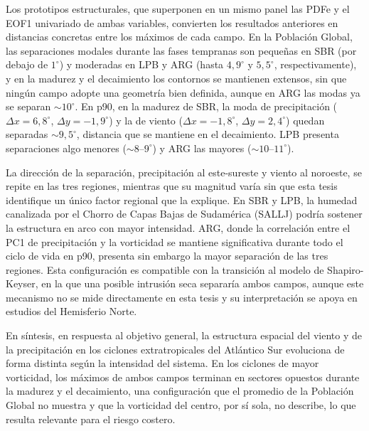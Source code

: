 Los prototipos estructurales, que superponen en un mismo panel las PDFe y el EOF1 univariado de ambas variables, convierten los resultados anteriores en distancias concretas entre los máximos de cada campo. En la Población Global, las separaciones modales durante las fases tempranas son pequeñas en SBR (por debajo de $1^{\circ}$) y moderadas en LPB y ARG (hasta $4{,}9^{\circ}$ y $5{,}5^{\circ}$, respectivamente), y en la madurez y el decaimiento los contornos se mantienen extensos, sin que ningún campo adopte una geometría bien definida, aunque en ARG las modas ya se separan ${\sim}10^{\circ}$. En p90, en la madurez de SBR, la moda de precipitación ($\Delta x = 6{,}8^{\circ}$, $\Delta y = -1{,}9^{\circ}$) y la de viento ($\Delta x = -1{,}8^{\circ}$, $\Delta y = 2{,}4^{\circ}$) quedan separadas ${\sim}9{,}5^{\circ}$, distancia que se mantiene en el decaimiento. LPB presenta separaciones algo menores (${\sim}8$--$9^{\circ}$) y ARG las mayores (${\sim}10$--$11^{\circ}$).

La dirección de la separación, precipitación al este-sureste y viento al noroeste, se repite en las tres regiones, mientras que su magnitud varía sin que esta tesis identifique un único factor regional que la explique. En SBR y LPB, la humedad canalizada por el Chorro de Capas Bajas de Sudamérica (SALLJ) podría sostener la estructura en arco con mayor intensidad. ARG, donde la correlación entre el PC1 de precipitación y la vorticidad se mantiene significativa durante todo el ciclo de vida en p90, presenta sin embargo la mayor separación de las tres regiones. Esta configuración es compatible con la transición al modelo de Shapiro-Keyser, en la que una posible intrusión seca separaría ambos campos, aunque este mecanismo no se mide directamente en esta tesis y su interpretación se apoya en estudios del Hemisferio Norte.

En síntesis, en respuesta al objetivo general, la estructura espacial del viento y de la precipitación en los ciclones extratropicales del Atlántico Sur evoluciona de forma distinta según la intensidad del sistema. En los ciclones de mayor vorticidad, los máximos de ambos campos terminan en sectores opuestos durante la madurez y el decaimiento, una configuración que el promedio de la Población Global no muestra y que la vorticidad del centro, por sí sola, no describe, lo que resulta relevante para el riesgo costero.
